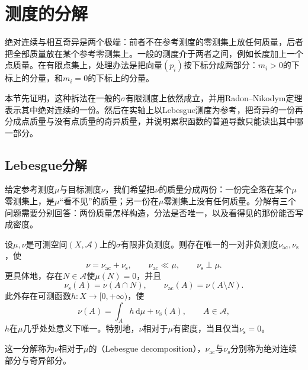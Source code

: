 \section{测度的分解}
\label{sec:dens-decomposition}

绝对连续与相互奇异是两个极端：前者不在参考测度的零测集上放任何质量，后者把全部质量放在某个参考零测集上。一般的测度介于两者之间，例如长度加上一个点质量。在有限点集上，处理办法是把向量$(p_i)$按下标分成两部分：$m_i>0$的下标上的分量，和$m_i=0$的下标上的分量。

本节先证明，这种拆法在一般的$\sigma$有限测度上依然成立，并用Radon–Nikodym定理表示其中绝对连续的一份。然后在实轴上以Lebesgue测度为参考，把奇异的一份再分成点质量与没有点质量的奇异质量，并说明累积函数的普通导数只能读出其中哪一部分。

\subsection{Lebesgue分解}
\label{sec:dens-lebesgue-decomposition}

给定参考测度$\mu$与目标测度$\nu$，我们希望把$\nu$的质量分成两份：一份完全落在某个$\mu$零测集上，是$\mu$“看不见”的质量；另一份在$\mu$零测集上没有任何质量。分解有三个问题需要分别回答：两份质量怎样构造，分法是否唯一，以及看得见的那份能否写成密度。

\begin{theorem}[Lebesgue分解]
\label{thm:dens-lebesgue-decomposition}
设$\mu,\nu$是可测空间$(X,\mathcal A)$上的$\sigma$有限非负测度。则存在唯一的一对非负测度$\nu_{\mathrm{ac}},\nu_{\mathrm s}$，使
\begin{equation}
\nu=\nu_{\mathrm{ac}}+\nu_{\mathrm s},\qquad\nu_{\mathrm{ac}}\ll\mu,\qquad\nu_{\mathrm s}\perp\mu .
\label{eq:dens-lebesgue-split}
\end{equation}
更具体地，存在$N\in\mathcal A$使$\mu(N)=0$，并且
\begin{equation}
\nu_{\mathrm s}(A)=\nu(A\cap N),\qquad\nu_{\mathrm{ac}}(A)=\nu(A\setminus N).
\label{eq:dens-lebesgue-set}
\end{equation}
此外存在可测函数$h:X\to[0,+\infty)$，使
\begin{equation}
\nu(A)=\int_Ah\,\mathrm d\mu+\nu_{\mathrm s}(A),\qquad A\in\mathcal A ,
\label{eq:dens-lebesgue-form}
\end{equation}
$h$在$\mu$几乎处处意义下唯一。特别地，$\nu$相对于$\mu$有密度，当且仅当$\nu_{\mathrm s}=0$。
\end{theorem}

这一分解称为$\nu$相对于$\mu$的（Lebesgue decomposition），$\nu_{\mathrm{ac}}$与$\nu_{\mathrm s}$分别称为绝对连续部分与奇异部分。

